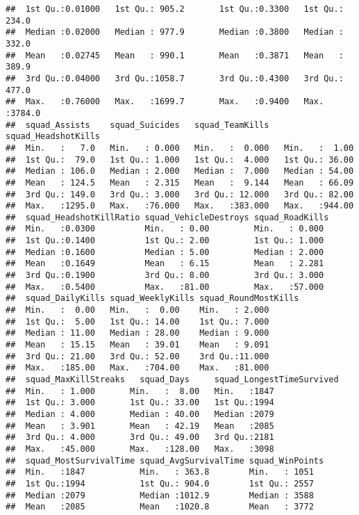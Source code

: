 \documentclass[]{article}
\begin{document}
\begin{verbatim}
##  1st Qu.:0.01000   1st Qu.: 905.2       1st Qu.:0.3300   1st Qu.: 234.0  
##  Median :0.02000   Median : 977.9       Median :0.3800   Median : 332.0  
##  Mean   :0.02745   Mean   : 990.1       Mean   :0.3871   Mean   : 389.9  
##  3rd Qu.:0.04000   3rd Qu.:1058.7       3rd Qu.:0.4300   3rd Qu.: 477.0  
##  Max.   :0.76000   Max.   :1699.7       Max.   :0.9400   Max.   :3784.0  
##  squad_Assists    squad_Suicides   squad_TeamKills   squad_HeadshotKills
##  Min.   :   7.0   Min.   : 0.000   Min.   :  0.000   Min.   :  1.00     
##  1st Qu.:  79.0   1st Qu.: 1.000   1st Qu.:  4.000   1st Qu.: 36.00     
##  Median : 106.0   Median : 2.000   Median :  7.000   Median : 54.00     
##  Mean   : 124.5   Mean   : 2.315   Mean   :  9.144   Mean   : 66.09     
##  3rd Qu.: 149.0   3rd Qu.: 3.000   3rd Qu.: 12.000   3rd Qu.: 82.00     
##  Max.   :1295.0   Max.   :76.000   Max.   :383.000   Max.   :944.00     
##  squad_HeadshotKillRatio squad_VehicleDestroys squad_RoadKills 
##  Min.   :0.0300          Min.   : 0.00         Min.   : 0.000  
##  1st Qu.:0.1400          1st Qu.: 2.00         1st Qu.: 1.000  
##  Median :0.1600          Median : 5.00         Median : 2.000  
##  Mean   :0.1649          Mean   : 6.15         Mean   : 2.281  
##  3rd Qu.:0.1900          3rd Qu.: 8.00         3rd Qu.: 3.000  
##  Max.   :0.5400          Max.   :81.00         Max.   :57.000  
##  squad_DailyKills squad_WeeklyKills squad_RoundMostKills
##  Min.   :  0.00   Min.   :  0.00    Min.   : 2.000      
##  1st Qu.:  5.00   1st Qu.: 14.00    1st Qu.: 7.000      
##  Median : 11.00   Median : 28.00    Median : 9.000      
##  Mean   : 15.15   Mean   : 39.01    Mean   : 9.091      
##  3rd Qu.: 21.00   3rd Qu.: 52.00    3rd Qu.:11.000      
##  Max.   :185.00   Max.   :704.00    Max.   :81.000      
##  squad_MaxKillStreaks   squad_Days     squad_LongestTimeSurvived
##  Min.   : 1.000       Min.   :  8.00   Min.   :1847             
##  1st Qu.: 3.000       1st Qu.: 33.00   1st Qu.:1994             
##  Median : 4.000       Median : 40.00   Median :2079             
##  Mean   : 3.901       Mean   : 42.19   Mean   :2085             
##  3rd Qu.: 4.000       3rd Qu.: 49.00   3rd Qu.:2181             
##  Max.   :45.000       Max.   :128.00   Max.   :3098             
##  squad_MostSurvivalTime squad_AvgSurvivalTime squad_WinPoints
##  Min.   :1847           Min.   : 363.8        Min.   : 1051  
##  1st Qu.:1994           1st Qu.: 904.0        1st Qu.: 2557  
##  Median :2079           Median :1012.9        Median : 3588  
##  Mean   :2085           Mean   :1020.8        Mean   : 3772  

\end{verbatim}
\end{document}
